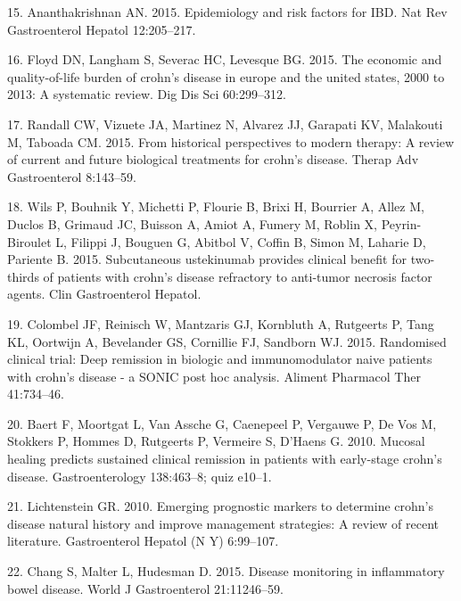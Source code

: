 \documentclass[11pt,]{article}
\begin{document}
\hypertarget{ref-ananthakrishnan_epidemiology_2015}{}
15. Ananthakrishnan AN. 2015. Epidemiology and risk factors for IBD. Nat
Rev Gastroenterol Hepatol 12:205--217.

\hypertarget{ref-floyd_economicburden_2015}{}
16. Floyd DN, Langham S, Severac HC, Levesque BG. 2015. The economic and
quality-of-life burden of crohn's disease in europe and the united
states, 2000 to 2013: A systematic review. Dig Dis Sci 60:299--312.

\hypertarget{ref-randall_CDbiologics_2015}{}
17. Randall CW, Vizuete JA, Martinez N, Alvarez JJ, Garapati KV,
Malakouti M, Taboada CM. 2015. From historical perspectives to modern
therapy: A review of current and future biological treatments for
crohn's disease. Therap Adv Gastroenterol 8:143--59.

\hypertarget{ref-wils_ust_2015}{}
18. Wils P, Bouhnik Y, Michetti P, Flourie B, Brixi H, Bourrier A, Allez
M, Duclos B, Grimaud JC, Buisson A, Amiot A, Fumery M, Roblin X,
Peyrin-Biroulet L, Filippi J, Bouguen G, Abitbol V, Coffin B, Simon M,
Laharie D, Pariente B. 2015. Subcutaneous ustekinumab provides clinical
benefit for two-thirds of patients with crohn's disease refractory to
anti-tumor necrosis factor agents. Clin Gastroenterol Hepatol.

\hypertarget{ref-colombel_deepremission_2015}{}
19. Colombel JF, Reinisch W, Mantzaris GJ, Kornbluth A, Rutgeerts P,
Tang KL, Oortwijn A, Bevelander GS, Cornillie FJ, Sandborn WJ. 2015.
Randomised clinical trial: Deep remission in biologic and
immunomodulator naive patients with crohn's disease - a SONIC post hoc
analysis. Aliment Pharmacol Ther 41:734--46.

\hypertarget{ref-baert_mucosalhealing_2010}{}
20. Baert F, Moortgat L, Van Assche G, Caenepeel P, Vergauwe P, De Vos
M, Stokkers P, Hommes D, Rutgeerts P, Vermeire S, D'Haens G. 2010.
Mucosal healing predicts sustained clinical remission in patients with
early-stage crohn's disease. Gastroenterology 138:463--8; quiz e10--1.

\hypertarget{ref-Lichtenstein_biomarkers_2010}{}
21. Lichtenstein GR. 2010. Emerging prognostic markers to determine
crohn's disease natural history and improve management strategies: A
review of recent literature. Gastroenterol Hepatol (N Y) 6:99--107.

\hypertarget{ref-Chang_biomarkers_2015}{}
22. Chang S, Malter L, Hudesman D. 2015. Disease monitoring in
inflammatory bowel disease. World J Gastroenterol 21:11246--59.
\end{document}
